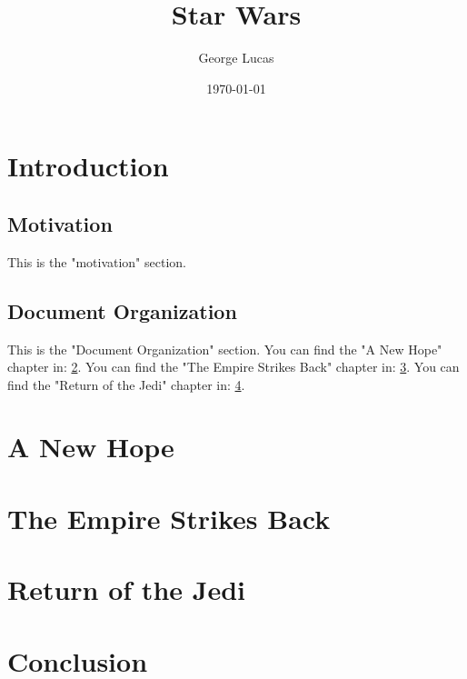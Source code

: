 \documentclass[a4paper, 12pt]{report}
\title{Star Wars}
\author{George Lucas}
\date{\today}
\newcommand*{\eg}[1]{for example, #1}
\begin{document}
  \new
  \maketitle

  \tableofcontents

  \chapter[short]{Introduction}
  \label{chap:intro}

    \section[short]{Motivation}
    \label{chap:sec:motivation}
      This is the "motivation" section.

      {\begin{center}}
        You can find motivation \eg{in this movies}.
      {\end{center}}

    \section[short]{Document Organization}
    \label{chap:sec:documentOrganiztion}
      This is the "Document Organization" section. 
      \newline
      You can find the "A New Hope" chapter in: \ref*{chap:newHope}.
      You can find the "The Empire Strikes Back" chapter in: \ref*{chap:empireStrikesBack}.
      You can find the "Return of the Jedi" chapter in: \ref*{chap:returnOfTheJedi}.
  
  \chapter[short]{A New Hope}
  \label{chap:newHope}
  
  \chapter[short]{The Empire Strikes Back}
  \label{chap:empireStrikesBack}

  \chapter[short]{Return of the Jedi}
  \label{chap:returnOfTheJedi}

  \chapter[short]{Conclusion}
  \label{chap:conclusion}

  
\end{document}
